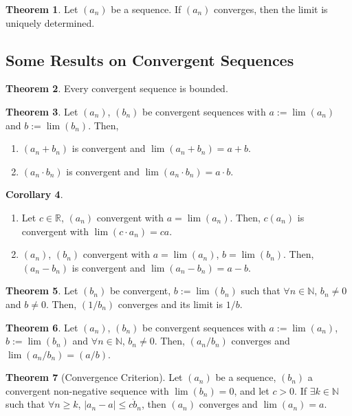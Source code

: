 \documentclass[reqno,11pt]{amsart}
\theoremstyle{definition}
\newtheorem{theorem}{Theorem}
\newtheorem{corollary}[theorem]{Corollary}
\theoremstyle{definition}
\theoremstyle{remark}
\newcommand{\R}{\mathbb{R}}
\newcommand{\N}{\mathbb{N}}
\begin{document}
\begin{theorem}
	Let $(a_n)$ be a sequence. If $(a_n)$ converges, then the limit is uniquely determined.
\end{theorem}

\subsection{Some Results on Convergent Sequences}
\begin{theorem}
	Every convergent sequence is bounded. 
\end{theorem}

\begin{theorem}
	Let $(a_n)$, $(b_n)$ be convergent sequences with $a := \lim (a_n)$ and $b:= \lim (b_n)$. Then, 
	\begin{enumerate}[noitemsep]
		\item $(a_n + b_n) $ is convergent and $\lim(a_n + b_n) = a+b$. 
		\item $(a_n \cdot b_n)$ is convergent and $\lim ( a_n \cdot b_n) = a \cdot b$. 
	\end{enumerate}
\end{theorem}

\begin{corollary}
\begin{enumerate}[noitemsep]
	\item Let $c \in \R$, $(a_n)$ convergent with $a = \lim (a_n)$. Then, $c (a_n)$ is convergent with $\lim(c \cdot a_n) = ca$.
	\item $(a_n)$, $(b_n)$ convergent with $a = \lim ( a_n)$, $b = \lim (b_n)$. Then, $(a_n - b_n)$ is convergent and $\lim (a_n - b_n) = a -b$.
\end{enumerate}
\end{corollary}


\begin{theorem}
	Let $(b_n)$ be convergent, $b:= \lim (b_n)$ such that $\forall n \in \N$, $b_n \neq 0$ and $b \neq 0$. Then, $(1/b_n)$ converges and its limit is $1/b$.
\end{theorem}

\begin{theorem}
	Let $(a_n)$, $(b_n)$ be convergent sequences with $a := \lim (a_n)$, $b:= \lim (b_n)$ and $\forall n \in \N$, $b_n \neq 0$. Then, $(a_n / b_n)$ converges and $\lim (a_n / b_n) = (a/b)$.
\end{theorem}

\begin{theorem}[Convergence Criterion]
	Let $(a_n)$ be a sequence, $(b_n)$ a convergent non-negative sequence with $\lim (b_n) = 0$, and let $c > 0$. If $\exists k \in \N$ such that $\forall n \geq k$, $|a_n - a| \leq c \dot b_n$, then $(a_n)$ converges and $\lim(a_n) = a$.
\end{theorem}
\end{document}
